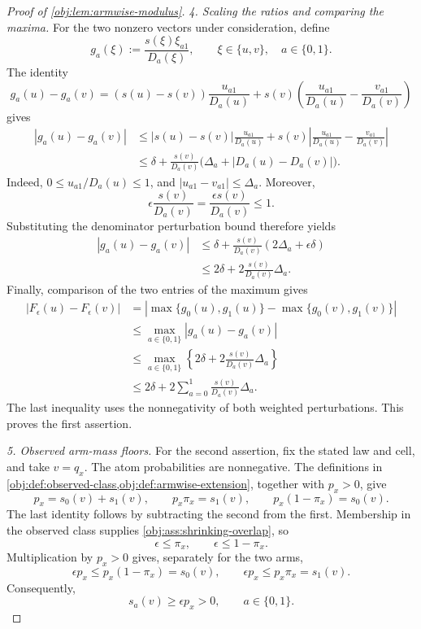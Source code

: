 \documentclass[11pt]{article}
\begin{document}
\begin{proof}[Proof of \cref{obj:lem:armwise-modulus}]
\emph{4. Scaling the ratios and comparing the maxima.}
For the two nonzero vectors under consideration, define
\[
g_a(\xi):=\frac{s(\xi)\xi_{a1}}{D_a(\xi)},
\qquad \xi\in\{u,v\},\quad a\in\{0,1\}.
\]
The identity
\[
g_a(u)-g_a(v)
=
(s(u)-s(v))\frac{u_{a1}}{D_a(u)}
+s(v)\left(\frac{u_{a1}}{D_a(u)}
           -\frac{v_{a1}}{D_a(v)}\right)
\]
gives
\[
\begin{aligned}
|g_a(u)-g_a(v)|
&\leq |s(u)-s(v)|\frac{u_{a1}}{D_a(u)}
+s(v)\left|\frac{u_{a1}}{D_a(u)}
           -\frac{v_{a1}}{D_a(v)}\right|\\
&\leq\delta+
\frac{s(v)}{D_a(v)}
\bigl(\Delta_a+|D_a(u)-D_a(v)|\bigr).
\end{aligned}
\]
Indeed, \(0\leq u_{a1}/D_a(u)\leq1\), and
\(
|u_{a1}-v_{a1}|\leq\Delta_a
\).
Moreover,
\[
\epsilon\frac{s(v)}{D_a(v)}
=\frac{\epsilon s(v)}{D_a(v)}\leq1.
\]
Substituting the denominator perturbation bound therefore yields
\[
\begin{aligned}
|g_a(u)-g_a(v)|
&\leq\delta+
\frac{s(v)}{D_a(v)}(2\Delta_a+\epsilon\delta)\\
&\leq2\delta+2\frac{s(v)}{D_a(v)}\Delta_a.
\end{aligned}
\]
Finally, comparison of the two entries of the maximum gives
\[
\begin{aligned}
|F_\epsilon(u)-F_\epsilon(v)|
&=|\max\{g_0(u),g_1(u)\}-\max\{g_0(v),g_1(v)\}|\\
&\leq\max_{a\in\{0,1\}}|g_a(u)-g_a(v)|\\
&\leq\max_{a\in\{0,1\}}
 \left\{2\delta+2\frac{s(v)}{D_a(v)}\Delta_a\right\}\\
&\leq2\delta+
2\sum_{a=0}^1\frac{s(v)}{D_a(v)}\Delta_a.
\end{aligned}
\]
The last inequality uses the nonnegativity of both weighted perturbations. This proves the first assertion.

\emph{5. Observed arm-mass floors.}
For the second assertion, fix the stated law and cell, and take \(v=q_x\). The atom probabilities are nonnegative. The definitions in \cref{obj:def:observed-class,obj:def:armwise-extension}, together with \(p_x>0\), give
\[
p_x=s_0(v)+s_1(v),\qquad
p_x\pi_x=s_1(v),\qquad
p_x(1-\pi_x)=s_0(v).
\]
The last identity follows by subtracting the second from the first. Membership in the observed class supplies \cref{obj:ass:shrinking-overlap}, so
\[
\epsilon\leq\pi_x,\qquad \epsilon\leq1-\pi_x.
\]
Multiplication by \(p_x>0\) gives, separately for the two arms,
\[
\epsilon p_x\leq p_x(1-\pi_x)=s_0(v),
\qquad
\epsilon p_x\leq p_x\pi_x=s_1(v).
\]
Consequently,
\[
s_a(v)\geq\epsilon p_x>0,\qquad a\in\{0,1\}.
\]


\end{proof}
\end{document}

